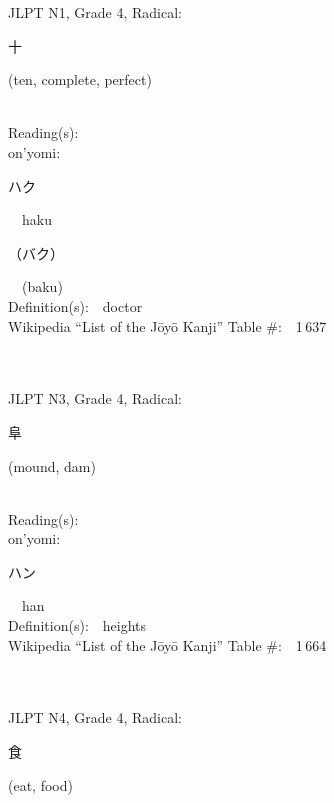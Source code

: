 \begin{multicols}{2}
{JLPT N1, Grade 4, Radical:\ \ {\begin{CJK}{UTF8}{min} 十 \end{CJK}} (ten, complete, perfect) } \\
Reading(s):\ \ \\
{\hspace*{1em}}on'yomi:\ \ \\
{\hspace*{2em}}{\begin{CJK}{UTF8}{min} ハク \end{CJK}}\ \ haku\ \ \\
{\hspace*{2em}}{\begin{CJK}{UTF8}{min} （バク） \end{CJK}}\ \ (baku)\ \ \\
Definition(s):\ \ doctor \\
Wikipedia ``List of the J\=oy\=o Kanji'' Table \#:\ \ 1\,637 \\
\ \ \\
{\fontsize{34pt}{40pt}  }\ \ \\  %
{JLPT N3, Grade 4, Radical:\ \ {\begin{CJK}{UTF8}{min} 阜 \end{CJK}} (mound, dam) } \\
Reading(s):\ \ \\
{\hspace*{1em}}on'yomi:\ \ \\
{\hspace*{2em}}{\begin{CJK}{UTF8}{min} ハン \end{CJK}}\ \ han\ \ \\
Definition(s):\ \ heights \\
Wikipedia ``List of the J\=oy\=o Kanji'' Table \#:\ \ 1\,664 \\
\ \ \\
{\fontsize{34pt}{40pt}  }\ \ \\  %
{JLPT N4, Grade 4, Radical:\ \ {\begin{CJK}{UTF8}{min} 食 \end{CJK}} (eat, food) } \\

\end{multicols}
